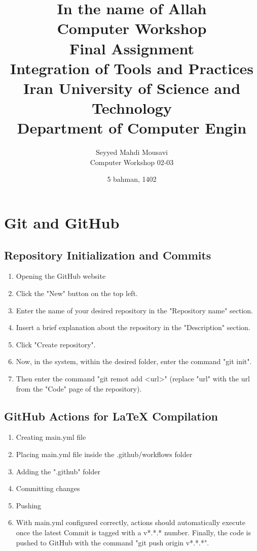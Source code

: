 \documentclass[titlepage]{article}
\title{
    \textbf{\Huge In the name of Allah}\\
    \vspace{2in}
    \textbf{Computer Workshop}\\
    Final Assignment\\
    Integration of Tools and Practices\\
    \vspace{0.1in}
    \large Iran University of Science and Technology\\
    \large Department of Computer Engin
    \vspace{0.5in}
}
\author{
    \vspace{0.1in}
    Seyyed Mahdi Mousavi\\
    Computer Workshop 02-03\\
    \vspace{0.2in}
}
\date{5 bahman, 1402}
\begin{document}
\pagestyle{fancy}

\maketitle
\tableofcontents
\newpage

\maketitle

\section{Git and GitHub}
\subsection{Repository Initialization and Commits}
\begin{enumerate}
    \item Opening the GitHub website
    \item Click the "New" button on the top left.
    \item Enter the name of your desired repository in the "Repository name" section.
    \item Insert a brief explanation about the repository in the "Description" section.
    \item Click "Create repository".
    \item Now, in the system, within the desired folder, enter the command "git init".
    \item Then enter the command "git remot add <url>" (replace "url" with the url from the "Code" page of the repository).
\end{enumerate}

\subsection{GitHub Actions for LaTeX Compilation}
\begin{enumerate}
    \item Creating main.yml file
    \item Placing main.yml file inside the .github/workflows folder
    \item Adding the ".github" folder
    \item Committing changes
    \item Pushing
    \item With main.yml configured correctly, actions should automatically execute once the latest Commit is tagged with a v*.*.* number. Finally, the code is pushed to GitHub with the command "git push origin v*.*.*".
\end{enumerate}
\end{document}
